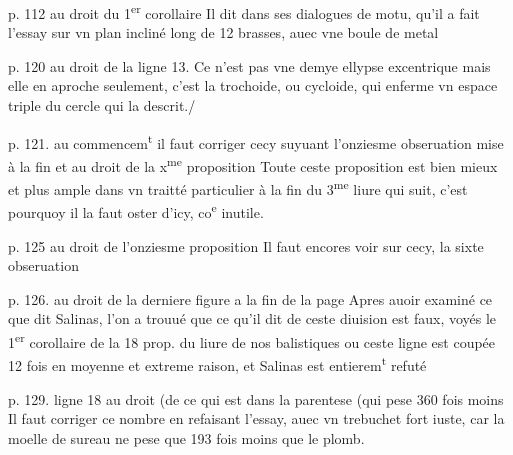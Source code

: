 \documentclass[11pt,a4paper]{article}
\begin{document}
p. 112 au droit du 1\textsuperscript{er} corollaire
Il dit dans ses dialogues de motu, qu'il a fait l'essay sur vn plan incliné long de 12 brasses, auec vne boule de metal

p. 120 au droit de la ligne 13.
Ce n'est pas vne demye ellypse excentrique mais elle en aproche seulement, c'est la trochoide, ou cycloide, qui enferme vn espace triple du  cercle qui la descrit./


p. 121. au commencem\textsuperscript{t}
il faut corriger cecy suyuant l'onziesme obseruation mise à la fin
et au droit de la x\textsuperscript{me} proposition
Toute ceste proposition est bien mieux et plus ample dans vn traitté particulier à la fin du 3\textsuperscript{me} liure qui suit, c'est pourquoy il la faut oster d'icy, co\textsuperscript{e} inutile.

p. 125 au droit de l'onziesme proposition
Il faut encores voir sur cecy, la sixte obseruation

p. 126. au droit de la derniere figure a la fin de la page
Apres auoir examiné ce que dit Salinas, l'on a trouué que ce qu'il dit de ceste diuision est faux, voyés le 1\textsuperscript{er} corollaire de la 18 prop. du liure de nos balistiques ou ceste ligne est coupée 12 fois en moyenne et extreme raison, et Salinas est entierem\textsuperscript{t} refuté

p. 129. ligne 18 au droit (de ce qui est dans la parentese (qui pese 360 fois moins
Il faut corriger ce nombre en refaisant l'essay, auec vn trebuchet fort iuste, car la moelle de sureau ne pese que 193 fois moins que le plomb.
\end{document}
